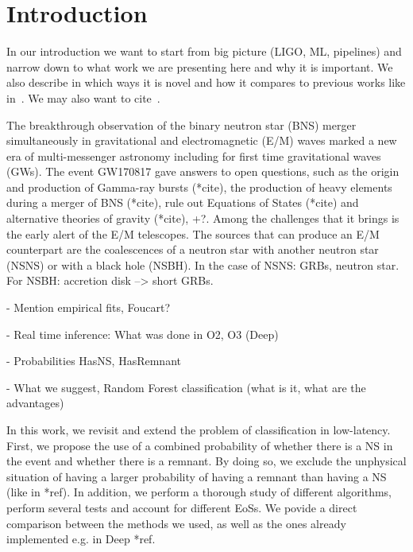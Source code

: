 \section{Introduction}
In our introduction we want to start from big picture (LIGO, ML, pipelines)
and narrow down to what work we are presenting here and why it is important. We
also describe in which ways it is novel and how it compares to previous works
like in~\cite{Chatterjee:2019avs}. We may also want to cite~\cite{Sachdev:2020lfd}. 


The breakthrough observation of the binary neutron star (BNS) merger simultaneously in gravitational and electromagnetic (E/M) waves \cite{LIGOScientific:2017ync} marked a new era of multi-messenger astronomy including for first time gravitational waves (GWs). The event GW170817 gave answers to open questions, such as the origin and production of Gamma-ray bursts (*cite), the production of heavy elements during a merger of BNS (*cite), rule out Equations of States (*cite) and alternative theories of gravity (*cite), +?. Among the challenges that it brings is the early alert of the E/M telescopes. The sources that can produce an E/M counterpart are the coalescences of a neutron star with another neutron star (NSNS) or with a black hole (NSBH). In the case of NSNS: GRBs, neutron star. For NSBH: accretion disk --> short GRBs.

- Mention empirical fits, Foucart?

- Real time inference: What was done in O2, O3 (Deep)

- Probabilities HasNS, HasRemnant

- What we suggest, Random Forest classification (what is it, what are the advantages)

In this work, we revisit and extend the problem of classification in low-latency. First, we propose the use of a combined probability of whether there is a NS in the event and whether there is a remnant. By doing so, we exclude the unphysical situation of having a larger probability of having a remnant than having a NS (like in *ref). In addition, we perform a thorough study of different algorithms, perform several tests and account for different EoSs. We povide a direct comparison between the methods we used, as well as the ones already implemented e.g. in Deep *ref. 
